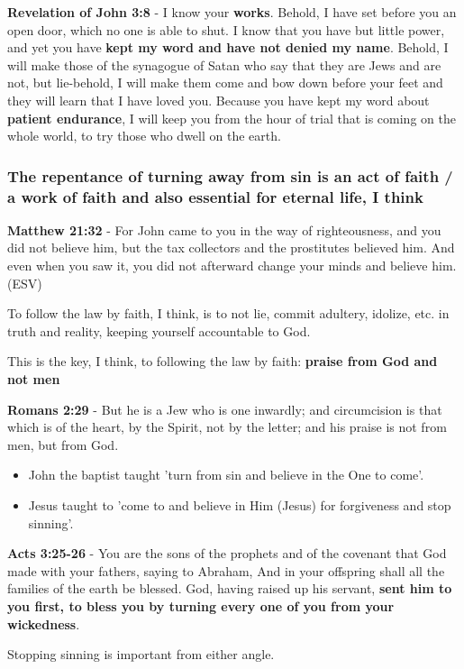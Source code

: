 \documentclass[11pt]{article}
\begin{document}
\textbf{Revelation of John 3:8} - I know your \textbf{works}. Behold, I have set before you an open door, which no one is able to shut. I know that you have but little power, and yet you have \textbf{kept my word and have not denied my name}. Behold, I will make those of the synagogue of Satan who say that they are Jews and are not, but lie-behold, I will make them come and bow down before your feet and they will learn that I have loved you. Because you have kept my word about \textbf{patient endurance}, I will keep you from the hour of trial that is coming on the whole world, to try those who dwell on the earth.

\subsubsection{The repentance of turning away from sin is an act of faith / a work of faith and also essential for eternal life, I think}
\label{sec:org5a73262}
\textbf{Matthew 21:32} - For John came to you in the way of righteousness, and you did not believe him, but the tax collectors and the prostitutes believed him. And even when you saw it, you did not afterward change your minds and believe him. (ESV)

To follow the law by faith, I think, is to not lie, commit adultery, idolize, etc. in truth and reality, keeping yourself accountable to God.

This is the key, I think, to following the law by faith: \textbf{praise from God and not men}

\textbf{Romans 2:29} - But he is a Jew who is one inwardly; and circumcision is that which is of the heart, by the Spirit, not by the letter; and his praise is not from men, but from God.

\begin{itemize}
\item John the baptist taught 'turn from sin and believe in the One to come'.
\item Jesus taught to 'come to and believe in Him (Jesus) for forgiveness and stop sinning'.
\end{itemize}

\textbf{Acts 3:25-26} - You are the sons of the prophets and of the covenant that God made with your fathers, saying to Abraham, And in your offspring shall all the families of the earth be blessed. God, having raised up his servant, \textbf{sent him to you first, to bless you by turning every one of you from your wickedness}.

Stopping sinning is important from either angle.
\end{document}
